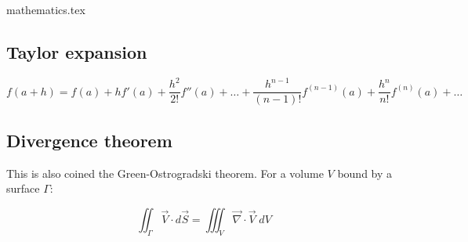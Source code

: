 \begin{flushright} {\tiny {\color{gray} mathematics.tex}} \end{flushright}

\subsection{Taylor expansion}

\[
f(a+h) = f(a) + h f'(a) + \frac{h^2}{2!} f''(a) + \dots + \frac{h^{n-1}}{(n-1)!}f^{(n-1)}(a)
+ \frac{h^n}{n!}f^{(n)}(a)+ \dots
\]


\subsection{Divergence theorem}

This is also coined the Green-Ostrogradski theorem. For a volume $V$ bound by a surface $\Gamma$: 

\begin{mdframed}[backgroundcolor=blue!5]
\begin{equation}
\iint_\Gamma \vec{V}\cdot d\vec{S} = \iiint_V \vec{\nabla}\cdot\vec{V} \; dV
\end{equation}
\end{mdframed}
